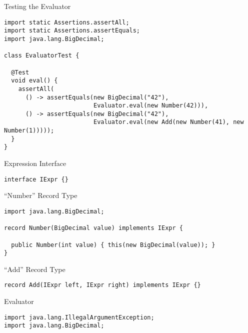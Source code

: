 \begin{verbnobox}[\footnotesize]
\begin{verbnobox}[\footnotesize]

\begin{cl}[]{Testing the Evaluator}
\begin{lstlisting}[language=MyJava]
import static Assertions.assertAll;
import static Assertions.assertEquals;
import java.lang.BigDecimal;

class EvaluatorTest {

  @Test
  void eval() {
    assertAll(
      () -> assertEquals(new BigDecimal("42"),
                         Evaluator.eval(new Number(42))),
      () -> assertEquals(new BigDecimal("42"),
                         Evaluator.eval(new Add(new Number(41), new Number(1)))));
  }
}
\end{lstlisting}
\end{cl}

\begin{cl}[]{Expression Interface}
\begin{lstlisting}[language=MyJava]
interface IExpr {}
\end{lstlisting}
\end{cl}

\begin{cl}[]{``Number'' Record Type}
\begin{lstlisting}[language=MyJava]
import java.lang.BigDecimal;

record Number(BigDecimal value) implements IExpr {
  
  public Number(int value) { this(new BigDecimal(value)); }
}
\end{lstlisting}
\end{cl}

\begin{cl}[]{``Add'' Record Type}
\begin{lstlisting}[language=MyJava]
record Add(IExpr left, IExpr right) implements IExpr {}
\end{lstlisting}
\end{cl}

\begin{cl}[]{Evaluator}
\begin{lstlisting}[language=MyJava]
import java.lang.IllegalArgumentException;
import java.lang.BigDecimal;


\end{lstlisting}
\end{cl}
\end{verbnobox}
\end{verbnobox}
